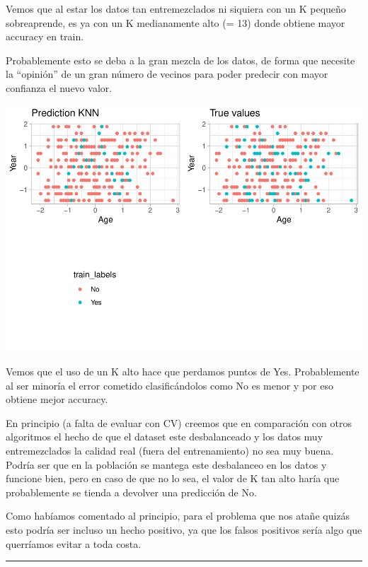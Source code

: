 \documentclass[
]{article}
\begin{document}
Vemos que al estar los datos tan entremezclados ni siquiera con un K
pequeño sobreaprende, es ya con un K medianamente alto (= 13) donde
obtiene mayor accuracy en train.

Probablemente esto se deba a la gran mezcla de los datos, de forma que
necesite la ``opinión'' de un gran número de vecinos para poder predecir
con mayor confianza el nuevo valor.

\begin{center}\includegraphics{Clasificacion_files/figure-latex/unnamed-chunk-12-1} \end{center}

Vemos que el uso de un K alto hace que perdamos puntos de Yes.
Probablemente al ser minoría el error cometido clasificándolos como No
es menor y por eso obtiene mejor accuracy.

En principio (a falta de evaluar con CV) creemos que en comparación con
otros algoritmos el hecho de que el dataset este desbalanceado y los
datos muy entremezclados la calidad real (fuera del entrenamiento) no
sea muy buena. Podría ser que en la población se mantega este
desbalanceo en los datos y funcione bien, pero en caso de que no lo sea,
el valor de K tan alto haría que probablemente se tienda a devolver una
predicción de No.

Como habíamos comentado al principio, para el problema que nos atañe
quizás esto podría ser incluso un hecho positivo, ya que los falsos
positivos sería algo que querríamos evitar a toda costa.

\begin{center}\rule{0.5\linewidth}{0.5pt}\end{center}
\end{document}
